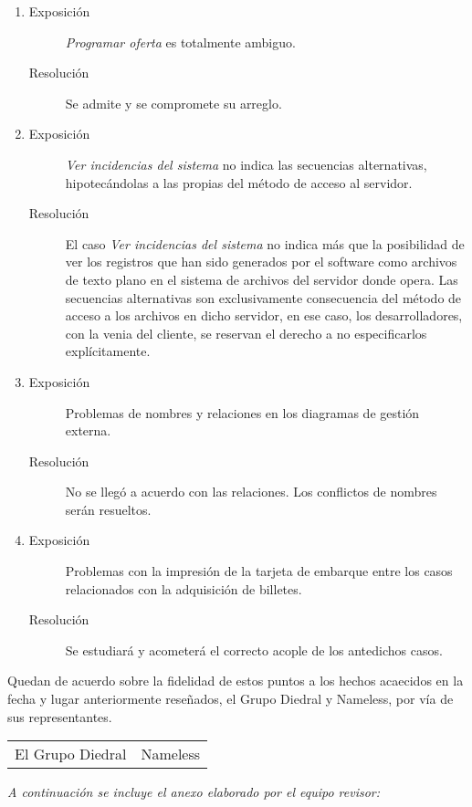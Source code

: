 \documentclass[twoside, a4paper, 11pt]{article}
\newcommand{\problema}[2]{\begin{description} \item[Exposición] #1 \item[Resolución] #2 \end{description}}
\begin{document}
\begin{enumerate}
		\item \problema{\textit{Programar oferta} es totalmente ambiguo.}{Se admite y se compromete su arreglo.}
		\item \problema{\textit{Ver incidencias del sistema} no indica las secuencias alternativas, hipotecándolas a las propias del método de acceso al servidor.}{El caso \textit{Ver incidencias del sistema} no indica más que la posibilidad de ver los \mbox{registros} que han sido generados por el software como archivos de texto plano en el sistema de archivos del servidor donde opera. Las secuencias alternativas son exclusivamente consecuencia del método de acceso a los archivos en dicho servidor, en ese caso, los \mbox{desarrolladores}, con la venia del cliente, se reservan el derecho a no especificarlos explícitamente.}
		\item \problema{Problemas de nombres y relaciones en los diagramas de gestión externa.}{No se llegó a acuerdo con las relaciones. Los conflictos de nombres serán resueltos.}
		\item \problema{Problemas con la impresión de la tarjeta de embarque entre los casos relacionados con la adquisición de billetes.}{Se estudiará y acometerá el correcto acople de los antedichos casos.}
	\end{enumerate}

	\vspace*{1cm}

	Quedan de acuerdo sobre la fidelidad de estos puntos a los hechos acaecidos en la fecha y lugar anteriormente reseñados, el Grupo Diedral y Nameless, por vía de sus representantes.\\

	\begin{tabularx}{.9\linewidth}{X  >{\raggedleft}X}
		El Grupo Diedral & Nameless
	\end{tabularx}

	\vfill{}
	{\itshape A continuación se incluye el anexo elaborado por el equipo revisor:}

	
\end{document}
